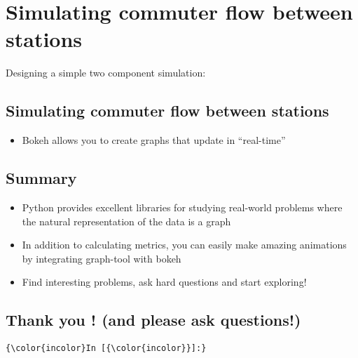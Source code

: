 \documentclass{article}
\begin{document}
    \section{Simulating commuter flow between
stations}\label{simulating-commuter-flow-between-stations}

Designing a simple two component simulation:

    \subsection{Simulating commuter flow between
stations}\label{simulating-commuter-flow-between-stations}

\begin{itemize}
\itemsep1pt\parskip0pt
\item
  Bokeh allows you to create graphs that update in ``real-time''
\end{itemize}

    \subsection{Summary}\label{summary}

\begin{itemize}
\itemsep1pt\parskip0pt
\item
  Python provides excellent libraries for studying real-world problems
  where the natural representation of the data is a graph
\item
  In addition to calculating metrics, you can easily make amazing
  animations by integrating graph-tool with bokeh
\item
  Find interesting problems, ask hard questions and start exploring!
\end{itemize}

    \subsection{Thank you ! (and please ask
questions!)}\label{thank-you-and-please-ask-questions}

    \begin{Verbatim}[commandchars=\\\{\}]
{\color{incolor}In [{\color{incolor}}]:} 
\end{Verbatim}


    
    
    
    
\end{document}
